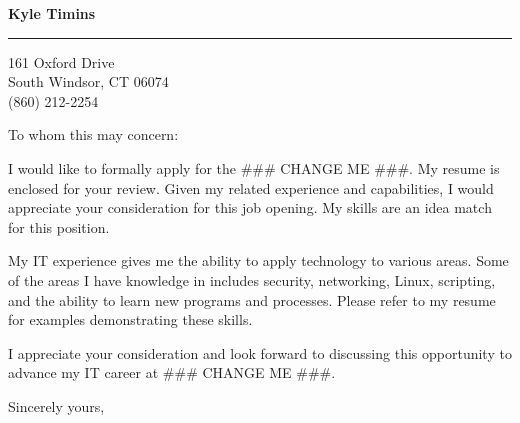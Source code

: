 \documentclass{letter} %
\begin{document}
\signature{Kyle Timins}            	   %
\longindentation=0pt                       %
\let\raggedleft\raggedright                %
 
 
\begin{letter}{}

\begin{center}
{\large\bf Kyle Timins} 
\end{center}
\medskip\hrule height 1pt
\begin{center}
{161 Oxford Drive \\   South Windsor, CT 06074 \\ (860) 212-2254} 
\end{center} \vspace{2 cm} %
 
 
\opening{To whom this may concern:} 

\noindent I would like to formally apply for the 
\#\#\# CHANGE ME \#\#\#. %
My resume is enclosed for your review. Given my related experience and 
capabilities, I would appreciate your consideration for this job opening. My 
skills are an idea match for this position.

\noindent My IT experience gives me the ability to apply technology 
to various areas. Some of the areas I have knowledge in includes 
security, networking, Linux, scripting, and the ability to learn new 
programs and processes. Please refer to my resume for examples 
demonstrating these skills.

\noindent I appreciate your consideration and look forward to discussing
this opportunity to advance my IT career at 
\#\#\# CHANGE ME \#\#\#. %
 
\closing{Sincerely yours,} 
 

 

\end{letter}

\vfill
\end{document}
